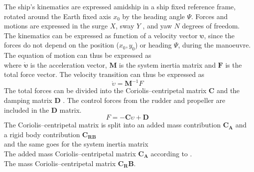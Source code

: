 The ship’s kinematics are expressed amidship in a ship fixed reference frame, rotated around the Earth fixed axis $x_0$ by the heading angle $\Psi$. Forces and motions are expressed in the surge $X$, sway $Y$ , and yaw $N$ degrees of freedom. The kinematics can be expressed as function of a velocity vector $\mathbf{\upsilon}$, since the forces do not depend on the position ($x_0,y_0$) or heading $\Psi$, during the manoeuvre.
\begin{equation}
    \label{eq:upsilon}
    
\end{equation}
The equation of motion can thus be expressed as
\begin{equation}
    \label{eq:upsilon1d}
    
\end{equation}
where $\mathbf{\dot{\upsilon}}$ is the acceleration vector, $\mathbf{M}$ is the system inertia matrix and $\mathbf{F}$ is the total force vector.
The velocity transition can thus be expressed as
\begin{equation}
    \label{eq:acc}
    \dot{\upsilon} = \mathbf{M}^{-1}F
\end{equation}
The total forces can be divided into the Coriolis–centripetal matrix $\mathbf{C}$ and the damping matrix $\mathbf{D}$ \citep{fossen_handbook_2021}. The control forces from the rudder and propeller are included in the $\mathbf{D}$ matrix.
\begin{equation}
    \label{eq:upsilon1d}
F = - \mathbf{C} \upsilon + \mathbf{D}
\end{equation}
The Coriolis–centripetal matrix is split into an added mass contribution $\mathbf{C_A}$ and a rigid body contribution $\mathbf{C_{RB}}$
\begin{equation}
    \label{eq:C}
    
\end{equation}
and the same goes for the system inertia matrix
\begin{equation}
    \label{eq:M}
    
\end{equation}
The added mass Coriolis–centripetal matrix $\mathbf{C_A}$ according to \citep{imlayCOMPLETEEXPRESSIONSADDED1961}.
\begin{equation}
    \label{eq:C_A}
    
\end{equation}
The mass Coriolis–centripetal matrix $\mathbf{C_RB}$.
\begin{equation}
    \label{eq:C_RB}
    
\end{equation}

